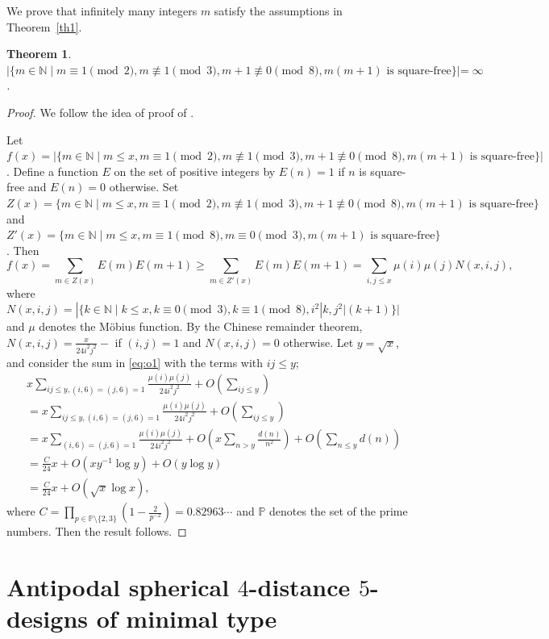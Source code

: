 \documentclass[11pt]{article}
\newtheorem{theorem}{Theorem}[section]
\theoremstyle{definition}
\theoremstyle{remark}
\begin{document}
We prove that infinitely many integers $m$ satisfy the assumptions in Theorem~\ref{th1}.  
\begin{theorem}
    $|\{m\in \mathbb{N} \mid m\equiv1\pmod{2},m\not\equiv 1 \pmod{3},m+1\not \equiv 0\pmod{8},m(m+1)\text{ is square-free}\}|=\infty$. 
\end{theorem}
\begin{proof}
We follow the idea of proof of \cite[Theorem~2]{HB}. 

Let $f(x)=|\{m\in \mathbb{N} \mid m\leq x,m\equiv1\pmod{2},m\not\equiv 1 \pmod{3},m+1\not \equiv 0\pmod{8},m(m+1)\text{ is square-free}\}|$. 
Define a function $E$ on the set of positive integers by $E(n)=1$ if $n$ is square-free and $E(n)=0$ otherwise. 
Set $Z(x)=\{m\in \mathbb{N} \mid m\leq x, m\equiv1\pmod{2},m\not\equiv 1 \pmod{3},m+1\not \equiv 0\pmod{8},m(m+1)\text{ is square-free}\}$ and 
 $Z'(x)=\{m\in \mathbb{N} \mid m\leq x, m\equiv1\pmod{8},m\equiv 0 \pmod{3},m(m+1)\text{ is square-free}\}$.  
Then 
\begin{equation}\label{eq:o1}
f(x)=\sum_{m\in Z(x)}E(m)E(m+1)
\geq \sum_{m\in Z'(x)}E(m)E(m+1)
=\sum_{i,j\leq x}\mu(i)\mu(j)N(x,i,j), 	
\end{equation}
where $N(x,i,j)=|\{k\in\mathbb{N} \mid k\leq x, k\equiv0 \pmod{3}, k\equiv 1\pmod{8}, i^2|k,j^2|(k+1)\}|$ and $\mu$ denotes the M\"{o}bius function. 
By the Chinese remainder theorem,  
$N(x,i,j)=\frac{x}{24i^2j^2}-$ if $(i,j)=1$ and $N(x,i,j)=0$ otherwise. 
Let $y=\sqrt{x}$, and consider the sum in \eqref{eq:o1} with the terms with $ij\leq y$; 
\begin{align*}
    &x\sum_{ij\leq y,(i,6)=(j,6)=1}\frac{\mu(i)\mu(j)}{24i^2j^2}+O(\sum_{ij\leq y})\\
    &=x\sum_{ij\leq y,(i,6)=(j,6)=1}\frac{\mu(i)\mu(j)}{24i^2j^2}+O(\sum_{ij\leq y})\\
    &=x\sum_{(i,6)=(j,6)=1}\frac{\mu(i)\mu(j)}{24i^2j^2}+O(x\sum_{n> y}\frac{d(n)}{n^2})+O(\sum_{n\leq y}d(n))\\
    &=\frac{C}{24}x+O(xy^{-1}\log y)+O(y\log y)\\
    &=\frac{C}{24}x+O(\sqrt{x}\log x),
\end{align*}
where $C=\prod_{p\in \mathbb{P}\setminus\{2,3\}}(1-\frac{2}{p^{-2}})=0.82963\cdots$ and $\mathbb{P}$ denotes the set of the prime numbers.
Then the result follows. 
\end{proof}

\section{Antipodal spherical $4$-distance $5$-designs of minimal type}\label{section4}
\end{document}
